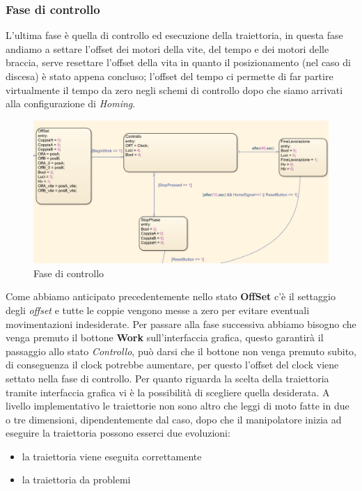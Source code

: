 \subsubsection{Fase di controllo}
L'ultima fase è quella di controllo ed esecuzione della traiettoria, in questa fase andiamo a settare l'offset dei motori della vite, del tempo e dei motori delle braccia, serve resettare l'offset della vita in quanto il posizionamento (nel caso di discesa) è stato appena concluso; l'offset del tempo ci permette di far partire virtualmente il tempo da zero negli schemi di controllo dopo che siamo arrivati alla configurazione di \textit{Homing}.
\begin{figure}[ht]
\begin{center}
    \includegraphics[scale=0.6]{Immagini/Sperimentale/state3New.png}
    \caption{Fase di controllo}
    \label{fig:Traiettoria}
\end{center}
\end{figure}
Come abbiamo anticipato precedentemente nello stato \textbf{OffSet} c'è il settaggio degli \textit{offset} e tutte le coppie vengono messe a zero per evitare eventuali movimentazioni indesiderate. Per passare alla fase successiva abbiamo bisogno che venga premuto il bottone \textbf{Work} sull'interfaccia grafica, questo garantirà il passaggio allo stato \textit{Controllo}, può darsi che il bottone non venga premuto subito, di conseguenza il clock potrebbe aumentare, per questo l'offset del clock viene settato nella fase di controllo. Per quanto riguarda la scelta della traiettoria tramite interfaccia grafica vi è la possibilità di scegliere quella desiderata. A livello implementativo le traiettorie non sono altro che leggi di moto fatte in due o tre dimensioni, dipendentemente dal caso, dopo che il manipolatore inizia ad eseguire la traiettoria possono esserci due evoluzioni:
\begin{itemize}
	\item la traiettoria viene eseguita correttamente
	\item la traiettoria da problemi
\end{itemize}
